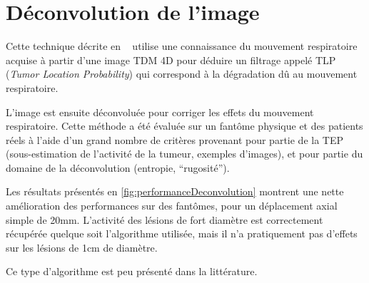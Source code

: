 \section{Déconvolution de l'image}

Cette technique décrite en ~\cite{naqa2006deblurring} utilise une connaissance du mouvement respiratoire acquise à partir d'une image TDM 4D pour déduire un filtrage appelé TLP (\textit{Tumor Location Probability}) qui correspond à la dégradation dû au mouvement respiratoire.

L'image est ensuite déconvoluée pour corriger les effets du mouvement respiratoire. Cette méthode a été évaluée sur un fantôme physique et des patients réels à l'aide d'un grand nombre de critères provenant pour partie de la TEP (sous-estimation de l'activité de la tumeur, exemples d'images), et pour partie du domaine de la déconvolution (entropie, ``rugosité'').

Les résultats présentés en \ref{fig:performanceDeconvolution} montrent une nette amélioration des performances sur des fantômes, pour un déplacement axial simple de 20mm. L'activité des lésions de fort diamètre est correctement récupérée quelque soit l'algorithme utilisée, mais il n'a pratiquement pas d'effets sur les lésions de 1cm de diamètre.

Ce type d'algorithme est peu présenté dans la littérature. 

